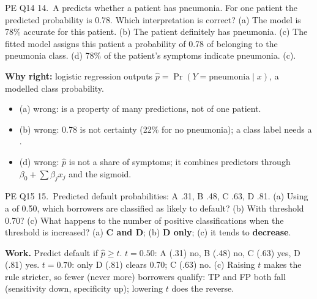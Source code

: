 \begin{qbox}{PE Q14}
14.~A  predicts whether a patient has pneumonia. For one patient the predicted probability is 0.78. Which interpretation is correct?
(a) The model is 78\% accurate for this patient. (b) The patient definitely has pneumonia. (c) The fitted model assigns this patient a probability of 0.78 of belonging to the pneumonia class. (d) 78\% of the patient's symptoms indicate pneumonia.
\ans (c).\par
\textbf{Why right:} logistic regression outputs $\hat p=\Pr(Y=\text{pneumonia}\mid x)$, a modelled class probability.
\begin{itemize}[leftmargin=1em,itemsep=0pt]
\item (a) wrong:  is a property of many predictions, not of one patient.
\item (b) wrong: 0.78 is not certainty (22\% for no pneumonia); a class label needs a .
\item (d) wrong: $\hat p$ is not a share of symptoms; it combines predictors through $\beta_0+\sum\beta_jx_j$ and the sigmoid.
\end{itemize}
\end{qbox}

\begin{qbox}{PE Q15}
15.~Predicted default probabilities: A .31, B .48, C .63, D .81. (a) Using a  of 0.50, which borrowers are classified as likely to default? (b) With threshold 0.70? (c) What happens to the number of positive classifications when the threshold is increased?
\ans (a) \textbf{C and D}; (b) \textbf{D only}; (c) it tends to \textbf{decrease}.\par
\textbf{Work.} Predict default if $\hat p\ge t$. $t=0.50$: A (.31) no, B (.48) no, C (.63) yes, D (.81) yes. $t=0.70$: only D (.81) clears 0.70; C (.63) no. (c) Raising $t$ makes the rule stricter, so fewer (never more) borrowers qualify: TP and FP both fall (sensitivity down, specificity up); lowering $t$ does the reverse. 
\end{qbox}

